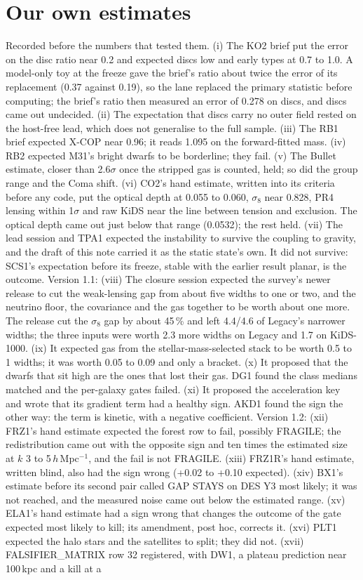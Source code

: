 \documentclass[10pt]{article}
\begin{document}
\section{Our own estimates}
Recorded before the numbers that tested them. (i) The KO2 brief put the error on the disc ratio near 0.2 and expected discs low and early types at 0.7 to 1.0. A model-only toy at the freeze gave the brief's ratio about twice the error of its replacement (0.37 against 0.19), so the lane replaced the primary statistic before computing; the brief's ratio then measured an error of 0.278 on discs, and discs came out undecided. (ii) The expectation that discs carry no outer field rested on the host-free lead, which does not generalise to the full sample. (iii) The RB1 brief expected X-COP near 0.96; it reads 1.095 on the forward-fitted mass. (iv) RB2 expected M31's bright dwarfs to be borderline; they fail. (v) The Bullet estimate, closer than 2.6$\sigma$ once the stripped gas is counted, held; so did the group range and the Coma shift. (vi) CO2's hand estimate, written into its criteria before any code, put the optical depth at 0.055 to 0.060, $\sigma_8$ near 0.828, PR4 lensing within 1$\sigma$ and raw KiDS near the line between tension and exclusion. The optical depth came out just below that range (0.0532); the rest held. (vii) The lead session and TPA1 expected the instability to survive the coupling to gravity, and the draft of this note carried it as the static state's own. It did not survive: SCS1's expectation before its freeze, stable with the earlier result planar, is the outcome. Version 1.1: (viii) The closure session expected the survey's newer release to cut the weak-lensing gap from about five widths to one or two, and the neutrino floor, the covariance and the gas together to be worth about one more. The release cut the $\sigma_8$ gap by about 45\,\% and left 4.4/4.6 of Legacy's narrower widths; the three inputs were worth 2.3 more widths on Legacy and 1.7 on KiDS-1000. (ix) It expected gas from the stellar-mass-selected stack to be worth 0.5 to 1 widths; it was worth 0.05 to 0.09 and only a bracket. (x) It proposed that the dwarfs that sit high are the ones that lost their gas. DG1 found the class medians matched and the per-galaxy gates failed. (xi) It proposed the acceleration key and wrote that its gradient term had a healthy sign. AKD1 found the sign the other way: the term is kinetic, with a negative coefficient. Version 1.2: (xii) FRZ1's hand estimate expected the forest row to fail, possibly FRAGILE; the redistribution came out with the opposite sign and ten times the estimated size at $k$ 3 to 5\,$h$\,Mpc$^{-1}$, and the fail is not FRAGILE. (xiii) FRZ1R's hand estimate, written blind, also had the sign wrong (+0.02 to +0.10 expected). (xiv) BX1's estimate before its second pair called GAP STAYS on DES Y3 most likely; it was not reached, and the measured noise came out below the estimated range. (xv) ELA1's hand estimate had a sign wrong that changes the outcome of the gate expected most likely to kill; its amendment, post hoc, corrects it. (xvi) PLT1 expected the halo stars and the satellites to split; they did not. (xvii) FALSIFIER\_MATRIX row 32 registered, with DW1, a plateau prediction near 100\,kpc and a kill at a 
\end{document}
